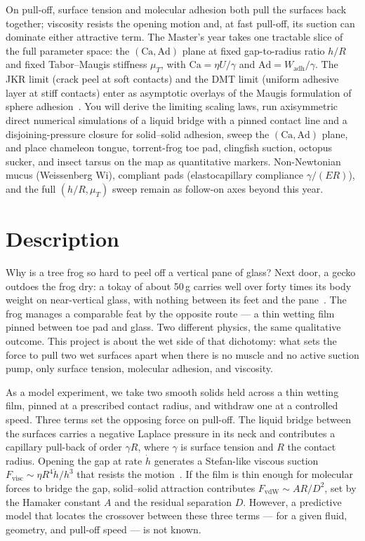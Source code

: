 \documentclass[11pt]{article}
\begin{document}
\begin{tcolorbox}[colback=mgray,colframe=mpurple,title=TL;DR]
On pull-off, surface tension and molecular adhesion both pull the surfaces back together; viscosity resists the opening motion and, at fast pull-off, its suction can dominate either attractive term. The Master's year takes one tractable slice of the full parameter space: the $(\mathrm{Ca}, \mathrm{Ad})$ plane at fixed gap-to-radius ratio $h/R$ and fixed Tabor--Maugis stiffness $\mu_T$, with $\mathrm{Ca} = \eta U / \gamma$ and $\mathrm{Ad} = W_{\mathrm{adh}}/\gamma$. The JKR limit (crack peel at soft contacts) and the DMT limit (uniform adhesive layer at stiff contacts) enter as asymptotic overlays of the Maugis formulation of sphere adhesion~\citep{maugis1992adhesion}. You will derive the limiting scaling laws, run axisymmetric direct numerical simulations of a liquid bridge with a pinned contact line and a disjoining-pressure closure for solid--solid adhesion, sweep the $(\mathrm{Ca}, \mathrm{Ad})$ plane, and place chameleon tongue, torrent-frog toe pad, clingfish suction, octopus sucker, and insect tarsus on the map as quantitative markers. Non-Newtonian mucus (Weissenberg $\mathrm{Wi}$), compliant pads (elastocapillary compliance $\gamma/(ER)$), and the full $(h/R, \mu_T)$ sweep remain as follow-on axes beyond this year.
\end{tcolorbox}

\section*{Description}

Why is a tree frog so hard to peel off a vertical pane of glass? Next door, a gecko outdoes the frog dry: a tokay of about 50\,g carries well over forty times its body weight on near-vertical glass, with nothing between its feet and the pane~\citep{autumnGeckoSeta2000}. The frog manages a comparable feat by the opposite route --- a thin wetting film pinned between toe pad and glass. Two different physics, the same qualitative outcome. This project is about the wet side of that dichotomy: what sets the force to pull two wet surfaces apart when there is no muscle and no active suction pump, only surface tension, molecular adhesion, and viscosity.

As a model experiment, we take two smooth solids held across a thin wetting film, pinned at a prescribed contact radius, and withdraw one at a controlled speed. Three terms set the opposing force on pull-off. The liquid bridge between the surfaces carries a negative Laplace pressure in its neck and contributes a capillary pull-back of order $\gamma R$, where $\gamma$ is surface tension and $R$ the contact radius. Opening the gap at rate $\dot h$ generates a Stefan-like viscous suction $F_{\mathrm{visc}} \sim \eta R^4 \dot h / h^3$ that resists the motion~\citep{stefan1874}. If the film is thin enough for molecular forces to bridge the gap, solid--solid attraction contributes $F_{\mathrm{vdW}} \sim A R / D^2$, set by the Hamaker constant $A$ and the residual separation $D$. However, a predictive model that locates the crossover between these three terms --- for a given fluid, geometry, and pull-off speed --- is not known.
\end{document}
